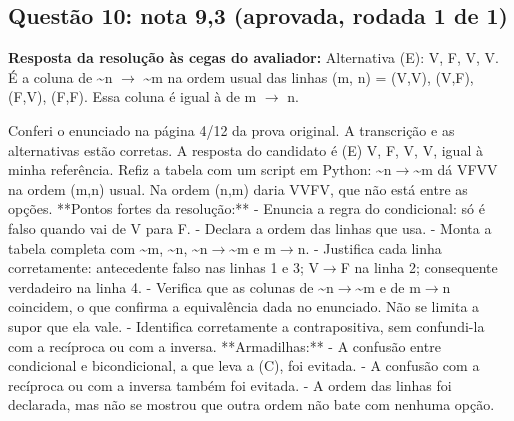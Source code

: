\documentclass{article}%
\begin{document}
\subsection*{Questão 10: nota 9,3 (aprovada, rodada 1 de 1)}%
\textbf{Resposta da resolução às cegas do avaliador:} Alternativa (E): V, F, V, V. É a coluna de \textasciitilde{}n $\to$ \textasciitilde{}m na ordem usual das linhas (m, n) = (V,V), (V,F), (F,V), (F,F). Essa coluna é igual à de m $\to$ n.\par %
Conferi o enunciado na página 4/12 da prova original. A transcrição e as alternativas estão corretas.\newline%
\newline%
A resposta do candidato é (E) V, F, V, V, igual à minha referência. Refiz a tabela com um script em Python: \textasciitilde{}n$\to$\textasciitilde{}m dá VFVV na ordem (m,n) usual. Na ordem (n,m) daria VVFV, que não está entre as opções.\newline%
\newline%
**Pontos fortes da resolução:**\newline%
{-} Enuncia a regra do condicional: só é falso quando vai de V para F.\newline%
{-} Declara a ordem das linhas que usa.\newline%
{-} Monta a tabela completa com \textasciitilde{}m, \textasciitilde{}n, \textasciitilde{}n$\to$\textasciitilde{}m e m$\to$n.\newline%
{-} Justifica cada linha corretamente: antecedente falso nas linhas 1 e 3; V$\to$F na linha 2; consequente verdadeiro na linha 4.\newline%
{-} Verifica que as colunas de \textasciitilde{}n$\to$\textasciitilde{}m e de m$\to$n coincidem, o que confirma a equivalência dada no enunciado. Não se limita a supor que ela vale.\newline%
{-} Identifica corretamente a contrapositiva, sem confundi{-}la com a recíproca ou com a inversa.\newline%
\newline%
**Armadilhas:**\newline%
{-} A confusão entre condicional e bicondicional, a que leva a (C), foi evitada.\newline%
{-} A confusão com a recíproca ou com a inversa também foi evitada.\newline%
{-} A ordem das linhas foi declarada, mas não se mostrou que outra ordem não bate com nenhuma opção.\newline%
\newline%
\end{document}
